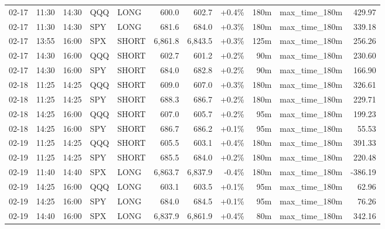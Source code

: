 \documentclass[11pt,a4paper,twoside]{article}
\begin{document}
\begin{center}
\begin{longtable}{>{\color{txtmain}}l l l l l r r r r >{\color{txtmain}}l r}
02-17 & 11:30 & 14:30 & QQQ & LONG & 600.0 & 602.7 & \textcolor{wingreen}{+0.4\%} & 180m & max\_time\_180m & \textcolor{wingreen}{429.97} \\
02-17 & 11:30 & 14:30 & SPY & LONG & 681.6 & 684.0 & \textcolor{wingreen}{+0.3\%} & 180m & max\_time\_180m & \textcolor{wingreen}{339.18} \\
02-17 & 13:55 & 16:00 & SPX & SHORT & 6,861.8 & 6,843.5 & \textcolor{wingreen}{+0.3\%} & 125m & max\_time\_180m & \textcolor{wingreen}{256.26} \\
02-17 & 14:30 & 16:00 & QQQ & SHORT & 602.7 & 601.2 & \textcolor{wingreen}{+0.2\%} & 90m & max\_time\_180m & \textcolor{wingreen}{230.60} \\
02-17 & 14:30 & 16:00 & SPY & SHORT & 684.0 & 682.8 & \textcolor{wingreen}{+0.2\%} & 90m & max\_time\_180m & \textcolor{wingreen}{166.90} \\
02-18 & 11:25 & 14:25 & QQQ & SHORT & 609.0 & 607.0 & \textcolor{wingreen}{+0.3\%} & 180m & max\_time\_180m & \textcolor{wingreen}{326.61} \\
02-18 & 11:25 & 14:25 & SPY & SHORT & 688.3 & 686.7 & \textcolor{wingreen}{+0.2\%} & 180m & max\_time\_180m & \textcolor{wingreen}{229.71} \\
02-18 & 14:25 & 16:00 & QQQ & SHORT & 607.0 & 605.7 & \textcolor{wingreen}{+0.2\%} & 95m & max\_time\_180m & \textcolor{wingreen}{199.23} \\
02-18 & 14:25 & 16:00 & SPY & SHORT & 686.7 & 686.2 & \textcolor{wingreen}{+0.1\%} & 95m & max\_time\_180m & \textcolor{wingreen}{55.53} \\
02-19 & 11:25 & 14:25 & QQQ & SHORT & 605.5 & 603.1 & \textcolor{wingreen}{+0.4\%} & 180m & max\_time\_180m & \textcolor{wingreen}{391.33} \\
02-19 & 11:25 & 14:25 & SPY & SHORT & 685.5 & 684.0 & \textcolor{wingreen}{+0.2\%} & 180m & max\_time\_180m & \textcolor{wingreen}{220.48} \\
02-19 & 11:40 & 14:40 & SPX & LONG & 6,863.7 & 6,837.9 & \textcolor{lossred}{-0.4\%} & 180m & max\_time\_180m & \textcolor{lossred}{-386.19} \\
02-19 & 14:25 & 16:00 & QQQ & LONG & 603.1 & 603.5 & \textcolor{wingreen}{+0.1\%} & 95m & max\_time\_180m & \textcolor{wingreen}{62.96} \\
02-19 & 14:25 & 16:00 & SPY & LONG & 684.0 & 684.5 & \textcolor{wingreen}{+0.1\%} & 95m & max\_time\_180m & \textcolor{wingreen}{76.26} \\
02-19 & 14:40 & 16:00 & SPX & LONG & 6,837.9 & 6,861.9 & \textcolor{wingreen}{+0.4\%} & 80m & max\_time\_180m & \textcolor{wingreen}{342.16} \\

\end{longtable}
\end{center}
\end{document}
